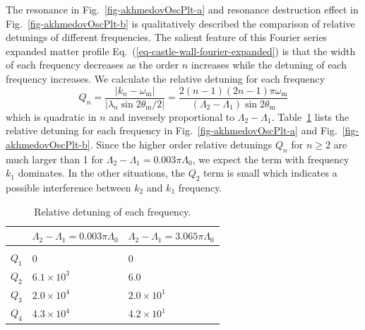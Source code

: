 \documentclass[%
reprint,
 amsmath,amssymb,
 aps,
]{revtex4-1}
\begin{document}
The resonance in Fig.~\ref{fig-akhmedovOscPlt-a} and resonance destruction effect in Fig.~\ref{fig-akhmedovOscPlt-b} is qualitatively described the comparison of relative detunings of different frequencies. The salient feature of this Fourier series expanded matter profile Eq.~(\ref{eq-castle-wall-fourier-expanded}) is that the width of each frequency decreases as the order $n$ increases while the detuning of each frequency increases. We calculate the relative detuning for each frequency
\begin{equation}
Q_n = \frac{\lvert k_n -\omega_{\mathrm m} \rvert}{ \lvert \lambda_n  \sin 2\theta_{\mathrm m}/2 \rvert } = \frac{2(n-1)(2n-1)\pi \omega_{\mathrm m}}{(\Lambda_2 - \Lambda_1)\sin 2\theta_{\mathrm m}}
\end{equation}
which is quadratic in $n$ and inversely proportional to $\Lambda_2-\Lambda_1$. Table~\ref{tab-q-values-each-mode} lists the relative detuning for each frequency in Fig.~\ref{fig-akhmedovOscPlt-a} and Fig.~\ref{fig-akhmedovOscPlt-b}. Since the higher order relative detunings $Q_n$ for $n\geq 2$ are much larger than 1 for $\Lambda_2-\Lambda_1 = 0.003\pi\Lambda_0$, we expect the term with frequency $k_1$ dominates. In the other situations, the $Q_2$ term is small which indicates a possible interference between $k_2$ and $k_1$ frequency. 





\begin{table}
\caption{\label{tab-q-values-each-mode}Relative detuning of each frequency.} 
\begin{ruledtabular} 
\begin{tabular}{lll} 
  & $\Lambda_2-\Lambda_1 = 0.003\pi\Lambda_0$ & $\Lambda_2-\Lambda_1 =3.065\pi\Lambda_0$ \\
\hline \\
 $Q_1$ & $0$ &  $0$ \\ 
 $Q_2$ & $6.1\times 10^3$ &  $6.0$ \\ 
 $Q_3$ & $2.0\times 10^4$ &  $2.0\times 10^1$ \\ 
 $Q_4$ & $4.3\times 10^4$ &  $4.2\times 10^1$ 
\end{tabular} 
\end{ruledtabular} 
\end{table}
\end{document}
